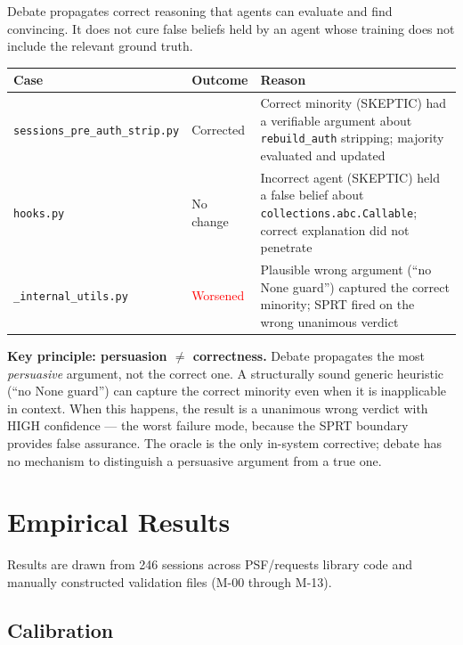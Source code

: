 \documentclass[11pt,a4paper]{article}
\begin{document}
Debate propagates correct reasoning that agents can evaluate and find
convincing. It does not cure false beliefs held by an agent whose training
does not include the relevant ground truth.

\begin{center}
\begin{tabular}{p{3.5cm}p{2.0cm}p{5.5cm}}
\toprule
Case & Outcome & Reason \\
\midrule
\texttt{sessions\_pre\_auth\_strip.py}
  & \textcolor{green!60!black}{Corrected}
  & Correct minority (SKEPTIC) had a verifiable argument about \texttt{rebuild\_auth} stripping; majority evaluated and updated \\[0.5em]
\texttt{hooks.py}
  & No change
  & Incorrect agent (SKEPTIC) held a false belief about \texttt{collections.abc.Callable}; correct explanation did not penetrate \\[0.5em]
\texttt{\_internal\_utils.py}
  & \textcolor{red}{Worsened}
  & Plausible wrong argument (``no None guard'') captured the correct minority; SPRT fired on the wrong unanimous verdict \\
\bottomrule
\end{tabular}
\end{center}

\textbf{Key principle: persuasion $\neq$ correctness.} Debate propagates
the most \emph{persuasive} argument, not the correct one. A structurally
sound generic heuristic (``no None guard'') can capture the correct minority
even when it is inapplicable in context. When this happens, the result is a
unanimous wrong verdict with HIGH confidence — the worst failure mode, because
the SPRT boundary provides false assurance. The oracle is the only in-system
corrective; debate has no mechanism to distinguish a persuasive argument from
a true one.

\section{Empirical Results}

Results are drawn from 246 sessions across PSF/requests library code and
manually constructed validation files (M-00 through M-13).

\subsection{Calibration}
\end{document}
